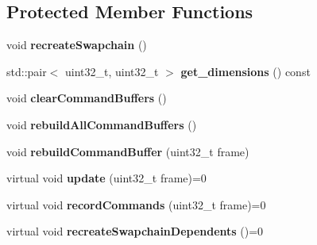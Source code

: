 \subsection*{Protected Member Functions}
\begin{DoxyCompactItemize}
\item 
\mbox{\label{classblaze_1_1ARenderer_abc172e917d52ebd9684fbfc91e83fded}} 
void {\bfseries recreate\+Swapchain} ()
\item 
\mbox{\label{classblaze_1_1ARenderer_ad9f386a77a9ce923901d9aa0f8379faa}} 
std\+::pair$<$ uint32\+\_\+t, uint32\+\_\+t $>$ {\bfseries get\+\_\+dimensions} () const
\item 
\mbox{\label{classblaze_1_1ARenderer_a47d147ed52d4e01b2b1e84e73bf4f383}} 
void {\bfseries clear\+Command\+Buffers} ()
\item 
\mbox{\label{classblaze_1_1ARenderer_a2a157380cb98e09ca023abc79663a0b6}} 
void {\bfseries rebuild\+All\+Command\+Buffers} ()
\item 
\mbox{\label{classblaze_1_1ARenderer_ae0f6fef0b400eefa7e1403dac4ff1cfd}} 
void {\bfseries rebuild\+Command\+Buffer} (uint32\+\_\+t frame)
\item 
\mbox{\label{classblaze_1_1ARenderer_a45d78544834276139f73316b80e18577}} 
virtual void {\bfseries update} (uint32\+\_\+t frame)=0
\item 
\mbox{\label{classblaze_1_1ARenderer_a364ef6ff07211f5b3d611c230c413cea}} 
virtual void {\bfseries record\+Commands} (uint32\+\_\+t frame)=0
\item 
\mbox{\label{classblaze_1_1ARenderer_a1db2f2b5de282cb85e5344744e91a7ab}} 
virtual void {\bfseries recreate\+Swapchain\+Dependents} ()=0
\end{DoxyCompactItemize}
